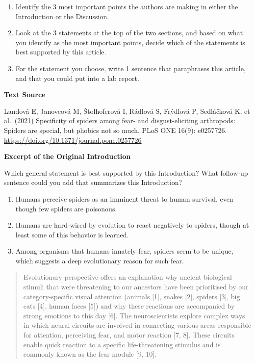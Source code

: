 \documentclass[
]{book}
\providecommand{\tightlist}{%
  \setlength{\itemsep}{0pt}\setlength{\parskip}{0pt}}
\begin{document}
\begin{enumerate}
\def\labelenumi{\arabic{enumi}.}
\tightlist
\item
  Identify the 3 most important points the authors are making in either the Introduction or the Discussion.
\item
  Look at the 3 statements at the top of the two sections, and based on what you identify as the most important points, decide which of the statements is best supported by this article.
\item
  For the statement you choose, write 1 sentence that paraphrases this article, and that you could put into a lab report.
\end{enumerate}

\textbf{Text Source}

Landová E, Janovcová M, Štolhoferová I, Rádlová S, Frýdlová P, Sedláčková K, et al.~(2021) Specificity of spiders among fear- and disgust-eliciting arthropods: Spiders are special, but phobics not so much. PLoS ONE 16(9): e0257726. \url{https://doi.org/10.1371/journal.pone.0257726}

\textbf{Excerpt of the Original Introduction}

Which general statement is best supported by this Introduction? What follow-up sentence could you add that summarizes this Introduction?

\begin{enumerate}
\def\labelenumi{\arabic{enumi}.}
\tightlist
\item
  Humans perceive spiders as an imminent threat to human survival, even though few spiders are poisonous.
\item
  Humans are hard-wired by evolution to react negatively to spiders, though at least some of this behavior is learned.
\item
  Among organisms that humans innately fear, spiders seem to be unique, which suggests a deep evolutionary reason for such fear.
\end{enumerate}

\begin{quote}
Evolutionary perspective offers an explanation why ancient biological stimuli that were threatening to our ancestors have been prioritised by our category-specific visual attention (animals {[}1{]}, snakes {[}2{]}, spiders {[}3{]}, big cats {[}4{]}, human faces {[}5{]}) and why these reactions are accompanied by strong emotions to this day {[}6{]}. The neuroscientists explore complex ways in which neural circuits are involved in connecting various areas responsible for attention, perceiving fear, and motor reaction {[}7, 8{]}. These circuits enable quick reaction to a specific life-threatening stimulus and is commonly known as the fear module {[}9, 10{]}.
\end{quote}
\end{document}
